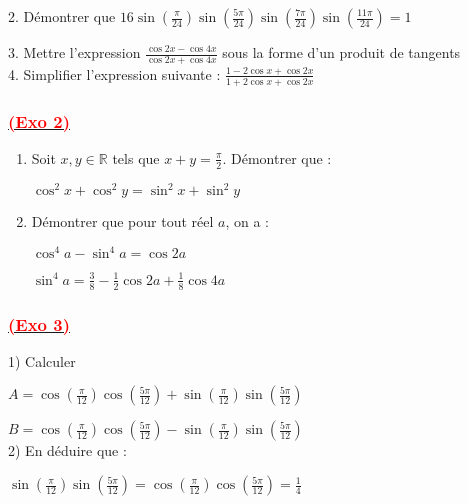 \documentclass[a4paper,12pt]{article}
\begin{document}
2. Démontrer que 
\(16\sin\left(\frac{\pi}{24}\right) \sin\left(\frac{5\pi}{24}\right) \sin\left(\frac{7\pi}{24}\right) \sin\left(\frac{11\pi}{24}\right) = 1\)

3. Mettre l'expression $\frac{\cos 2x - \cos 4x}{\cos 2x + \cos 4x}$ sous la forme d'un produit de tangents\\

4. Simplifier l'expression suivante : \( \frac{1 - 2\cos x + \cos 2x}{1 + 2\cos x + \cos 2x} \)

\subsubsection*{\underline{\textcolor{red}{ (Exo 2)}}}

\begin{enumerate}
    \item Soit \( x, y \in \mathbb{R} \) tels que \( x + y = \frac{\pi}{2} \). Démontrer que : 
    
\(\cos^2 x + \cos^2 y = \sin^2 x + \sin^2 y\)

    \item Démontrer que pour tout réel \( a \), on a :
    
\( \cos^4 a - \sin^4 a =\cos 2a \)

\( \sin^4 a = \frac{3}{8} - \frac{1}{2} \cos 2a + \frac{1}{8} \cos 4a \)
\end{enumerate}

\subsubsection*{\underline{\textcolor{red}{ (Exo 3)}}}

1) Calculer 

\( A = \cos\left(\frac{\pi}{12}\right)\cos\left(\frac{5\pi}{12}\right) + \sin\left(\frac{\pi}{12}\right)\sin\left(\frac{5\pi}{12}\right) \)

\vspace{0.5cm}

\(B=  \cos\left(\frac{\pi}{12}\right)\cos\left(\frac{5\pi}{12}\right) - \sin\left(\frac{\pi}{12}\right)\sin\left(\frac{5\pi}{12}\right) \)\\

2) En déduire que :

\( \sin\left(\frac{\pi}{12}\right)\sin\left(\frac{5\pi}{12}\right) = \cos\left(\frac{\pi}{12}\right)\cos\left(\frac{5\pi}{12}\right) = \frac{1}{4} \)

\vspace{0.5cm}
\end{document}
